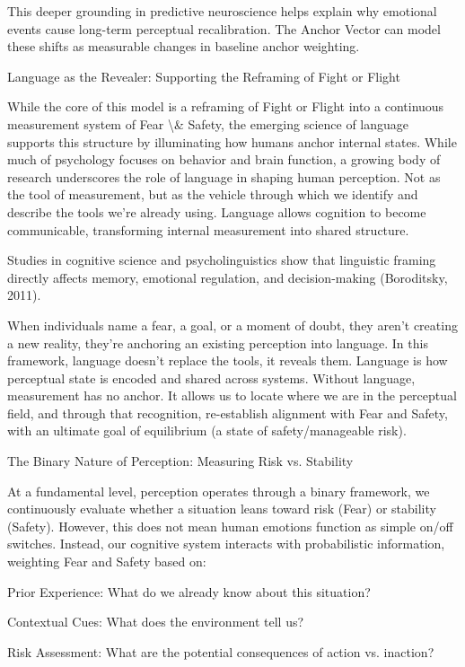 \documentclass[12pt]{article}
\begin{document}
This deeper grounding in predictive neuroscience helps explain why emotional events cause long-term perceptual recalibration. The Anchor Vector can model these shifts as measurable changes in baseline anchor weighting.

Language as the Revealer: Supporting the Reframing of Fight or Flight

While the core of this model is a reframing of Fight or Flight into a continuous measurement system of Fear \textbackslash{}& Safety, the emerging science of language supports this structure by illuminating how humans anchor internal states. While much of psychology focuses on behavior and brain function, a growing body of research underscores the role of language in shaping human perception. Not as the tool of measurement, but as the vehicle through which we identify and describe the tools we’re already using. Language allows cognition to become communicable, transforming internal measurement into shared structure.

Studies in cognitive science and psycholinguistics show that linguistic framing directly affects memory, emotional regulation, and decision-making (Boroditsky, 2011).

When individuals name a fear, a goal, or a moment of doubt, they aren't creating a new reality, they’re anchoring an existing perception into language. In this framework, language doesn’t replace the tools, it reveals them. Language is how perceptual state is encoded and shared across systems. Without language, measurement has no anchor. It allows us to locate where we are in the perceptual field, and through that recognition, re-establish alignment with Fear and Safety, with an ultimate goal of equilibrium (a state of safety/manageable risk).

The Binary Nature of Perception: Measuring Risk vs. Stability

At a fundamental level, perception operates through a binary framework, we continuously evaluate whether a situation leans toward risk (Fear) or stability (Safety). However, this does not mean human emotions function as simple on/off switches. Instead, our cognitive system interacts with probabilistic information, weighting Fear and Safety based on:

Prior Experience: What do we already know about this situation?

Contextual Cues: What does the environment tell us?

Risk Assessment: What are the potential consequences of action vs. inaction?
\end{document}
